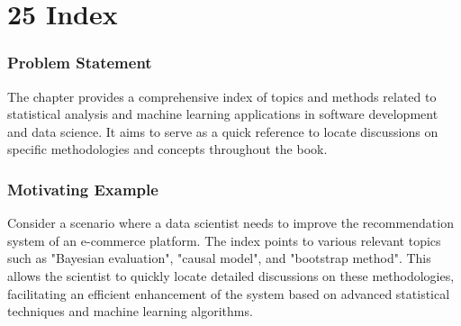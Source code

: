 \documentclass{article}
\begin{document}
\section*{25 Index}
\subsubsection*{Problem Statement}
The chapter provides a comprehensive index of topics and methods related to statistical analysis and machine learning applications in software development and data science. It aims to serve as a quick reference to locate discussions on specific methodologies and concepts throughout the book.

\subsubsection*{Motivating Example}
Consider a scenario where a data scientist needs to improve the recommendation system of an e-commerce platform. The index points to various relevant topics such as "Bayesian evaluation", "causal model", and "bootstrap method". This allows the scientist to quickly locate detailed discussions on these methodologies, facilitating an efficient enhancement of the system based on advanced statistical techniques and machine learning algorithms.
\end{document}
